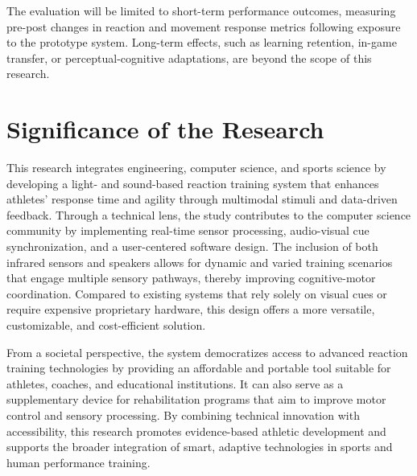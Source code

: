 The evaluation will be limited to short-term performance outcomes, measuring pre-post changes in reaction and movement response metrics following exposure to the prototype system. Long-term effects, such as learning retention, in-game transfer, or perceptual-cognitive adaptations, are beyond the scope of this research.


\section{Significance of the Research}
\label{sec:significance}

This research integrates engineering, computer science, and sports science by developing a light- and sound-based reaction training system that enhances athletes’ response time and agility through multimodal stimuli and data-driven feedback. Through a technical lens, the study contributes to the computer science community by implementing real-time sensor processing, audio-visual cue synchronization, and a user-centered software design. The inclusion of both infrared sensors and speakers allows for dynamic and varied training scenarios that engage multiple sensory pathways, thereby improving cognitive-motor coordination. Compared to existing systems that rely solely on visual cues or require expensive proprietary hardware, this design offers a more versatile, customizable, and cost-efficient solution.

From a societal perspective, the system democratizes access to advanced reaction training technologies by providing an affordable and portable tool suitable for athletes, coaches, and educational institutions. It can also serve as a supplementary device for rehabilitation programs that aim to improve motor control and sensory processing. By combining technical innovation with accessibility, this research promotes evidence-based athletic development and supports the broader integration of smart, adaptive technologies in sports and human performance training.